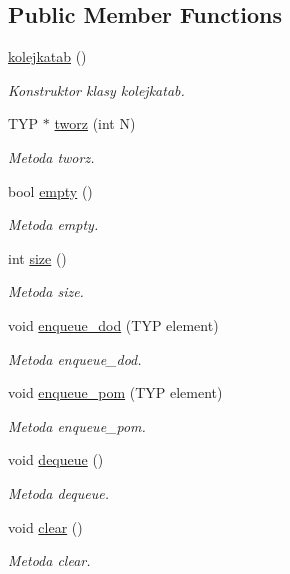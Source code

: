 \subsection*{Public Member Functions}
\begin{DoxyCompactItemize}
\item 
\hyperlink{classkolejkatab_ae8f978affe7d275f38b432ba89eddce7}{kolejkatab} ()
\begin{DoxyCompactList}\small\item\em Konstruktor klasy kolejkatab. \end{DoxyCompactList}\item 
T\-Y\-P $\ast$ \hyperlink{classkolejkatab_a19cfea1a6282ec8a3e7f7d903bad4ec0}{tworz} (int N)
\begin{DoxyCompactList}\small\item\em Metoda tworz. \end{DoxyCompactList}\item 
bool \hyperlink{classkolejkatab_a3a15f6d2fe43f387e60d63f11b68d0a5}{empty} ()
\begin{DoxyCompactList}\small\item\em Metoda empty. \end{DoxyCompactList}\item 
int \hyperlink{classkolejkatab_ab2bd484f25e38850871321cf8c695271}{size} ()
\begin{DoxyCompactList}\small\item\em Metoda size. \end{DoxyCompactList}\item 
void \hyperlink{classkolejkatab_a6ba37d3ed63eb91be0ec150dc0646c50}{enqueue\-\_\-dod} (T\-Y\-P element)
\begin{DoxyCompactList}\small\item\em Metoda enqueue\-\_\-dod. \end{DoxyCompactList}\item 
void \hyperlink{classkolejkatab_a1f4b14e081aef543ff4e08e2060042cb}{enqueue\-\_\-pom} (T\-Y\-P element)
\begin{DoxyCompactList}\small\item\em Metoda enqueue\-\_\-pom. \end{DoxyCompactList}\item 
void \hyperlink{classkolejkatab_ae15cc5e580f16def922ce447f38dbab5}{dequeue} ()
\begin{DoxyCompactList}\small\item\em Metoda dequeue. \end{DoxyCompactList}\item 
void \hyperlink{classkolejkatab_ab7b360e73b75756d96a1aa6a102e7318}{clear} ()
\begin{DoxyCompactList}\small\item\em Metoda clear. \end{DoxyCompactList}\end{DoxyCompactItemize}
